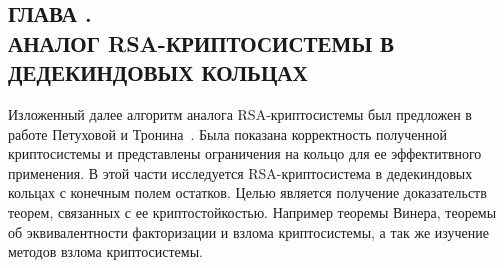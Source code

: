 \documentclass[_00_dissertation.tex]{subfiles}
\begin{document}
\onlyinsubfile{
    \renewcommand{\contentsname}{ОГЛАВЛЕНИЕ}
    \setcounter{tocdepth}{3}
    \tableofcontents
}

\newpage
\begin{center}
    \section*{ГЛАВА .\\ АНАЛОГ RSA-КРИПТОСИСТЕМЫ В ДЕДЕКИНДОВЫХ КОЛЬЦАХ}\label{section:RSA-cryptosystem}
\end{center}

Изложенный далее алгоритм аналога RSA-криптосистемы был предложен в работе Петуховой и Тронина~\cite{source:Petukhova}.
Была показана корректность полученной криптосистемы и представлены ограничения  на кольцо для ее эффектитвного применения.
В этой части исследуется RSA-криптосистема в дедекиндовых кольцах с конечным полем остатков.
Целью является получение доказательств теорем, связанных с ее криптостойкостью.
Например теоремы Винера, теоремы об эквивалентности факторизации и взлома криптосистемы, а так же изучение методов взлома криптосистемы.
\end{document}
